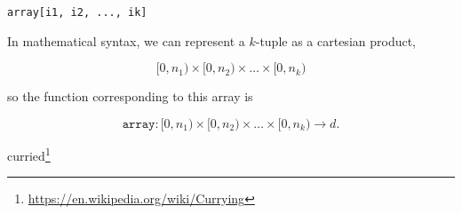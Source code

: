 \documentclass[12pt]{article}
\begin{document}
\begin{center}
\texttt{array[i1, i2, ..., ik]}
\end{center}

\noindent In mathematical syntax, we can represent a $k$-tuple as a cartesian product,

\[ [0, n_1) \times [0, n_2) \times \ldots \times [0, n_k) \]

\noindent so the function corresponding to this array is

\[ \texttt{array}: [0, n_1) \times [0, n_2) \times \ldots \times [0, n_k) \to d. \]

\noindent 


curried\footnote{\url{https://en.wikipedia.org/wiki/Currying}}
\end{document}
